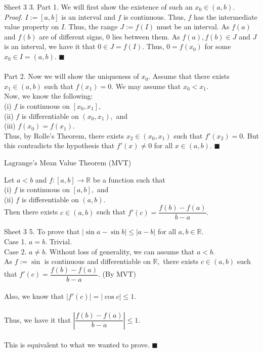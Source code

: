 \documentclass[handout, aspectratio=169]{beamer}
\begin{document}
\begin{frame}{Sheet 3}
	3. Part 1. We will first show the existence of such an $x_0 \in (a, b).$\\
	\emph{Proof.} $I := [a, b]$ is an interval and $f$ is continuous. Thus, $f$ has the intermediate value property on $I.$ Thus, the range $J := f(I)$ must be an interval. As $f(a)$ and $f(b)$ are of different signs, $0$ lies between them. As $f(a), f(b) \in J$ and $J$ is an interval, we have it that $0 \in J = f(I).$
	Thus, $0 = f(x_0)$ for some $x_0 \in I = (a, b).$ \hfill $\blacksquare$\\~\\
	Part 2. Now we will show the uniqueness of $x_0.$ Assume that there exists $x_1 \in (a, b)$ such that $f(x_1) = 0.$ We may assume that $x_0 < x_1.$\\
	Now, we know the following:\\
	(i) $f$ is continuous on $[x_0, x_1],$\\
	(ii) $f$ is differentiable on $(x_0, x_1),$ and\\
	(iii) $f(x_0) = f(x_1).$\\
	Thus, by Rolle's Theorem, there exists $x_2 \in (x_0, x_1)$ such that $f'(x_2) = 0.$ But this contradicts the hypothesis that $f'(x) \neq 0$ for all $x \in (a, b).$ \hfill $\blacksquare$\\
\end{frame}
\begin{frame}{Lagrange's Mean Value Theorem (MVT)}
	\begin{theorem}[MVT]
		Let $a < b$ and $f:[a, b] \to \mathbb{R}$ be a function such that\\
		(i) $f$ is continuous on $[a, b],$ and\\
		(ii) $f$ is differentiable on $(a, b).$\\
		Then there exists $c \in (a, b)$ such that $f'(c) = \dfrac{f(b) - f(a)}{b - a}.$
	\end{theorem}
\end{frame}
\begin{frame}{Sheet 3}
	5. To prove that $|\sin a - \sin b| \le |a - b|$ for all $a, b \in \mathbb{R}.$\\
	Case 1. $a = b.$ Trivial.\\
	Case 2. $a \neq b.$ Without loss of generality, we can assume that $a < b.$\\
	As $f := \sin$ is continuous and differentiable on $\mathbb{R},$ there exists $c \in (a, b)$ such that $f'(c) = \dfrac{f(b) - f(a)}{b - a}.$ \hfill (By MVT)\\~\\
	Also, we know that $|f'(c)| = |\cos c| \le 1.$\\~\\
	Thus, we have it that $\left|\dfrac{f(b) - f(a)}{b - a}\right| \le 1.$\\~\\
	This is equivalent to what we wanted to prove. \hfill $\blacksquare$
\end{frame}
\end{document}
